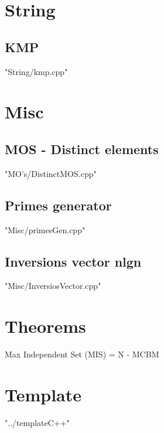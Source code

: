 \documentclass [12pt,twocolumn,oneside]{article}
\begin{document}
\newpage
\section{String}

\subsection{ KMP}
 {"String/kmp.cpp"}


\newpage
\section{Misc}

\subsection{ MOS - Distinct elements}
 {"MO's/DistinctMOS.cpp"}

\subsection{ Primes generator}
 {"Misc/primesGen.cpp"}

\subsection{ Inversions vector nlgn}
 {"Misc/InversiosVector.cpp"}	

\newpage
\section{Theorems}
	Max Independent Set (MIS) = N - MCBM
	
\newpage
\section{Template}
 {"../templateC++"}
\end{document}
